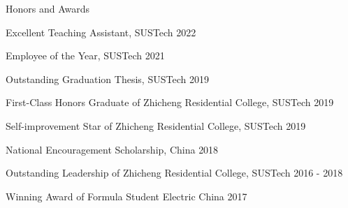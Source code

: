 \documentclass{resume} %
\begin{document}

\begin{rSection}{Honors and Awards}
    \vspace{-8pt}
    \item {Excellent Teaching Assistant, SUSTech}   \hfill {2022}  
     \vspace{-5pt}
    \item {Employee of the Year, SUSTech}   \hfill {2021}  
     \vspace{-5pt}
    \item {Outstanding Graduation Thesis, SUSTech}        \hfill {2019}
     \vspace{-5pt}
    \item {First-Class Honors Graduate of Zhicheng Residential College, SUSTech}   \hfill {2019}
     \vspace{-5pt}
    \item {Self-improvement Star of Zhicheng Residential College, SUSTech}   \hfill {2019}
     \vspace{-5pt}
    \item {National Encouragement Scholarship, China}        \hfill {2018}
     \vspace{-5pt}
    \item {Outstanding Leadership of Zhicheng Residential College, SUSTech} \hfill {2016 - 2018}
    \vspace{-5pt}  
     \item {Winning Award of Formula Student Electric China} \hfill {2017}
    \vspace{-5pt}

     


    \end{rSection}
\end{document}
